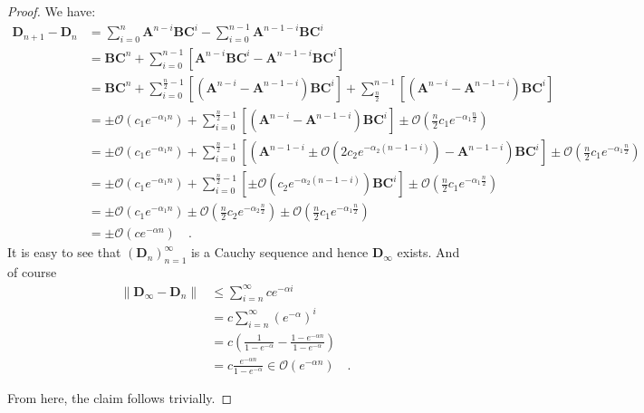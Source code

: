 \documentclass[../../main.tex]{subfiles}
\begin{document}
\begin{proof}
        We have:
        \begin{align*}
            \bm{D}_{n+1} - \bm{D}_{n} &= \sum_{i=0}^{n} \bm{A}^{n-i}\bm{BC}^i - \sum_{i=0}^{n-1} \bm{A}^{n-1-i}\bm{BC}^i \\
            &= \bm{BC}^n + \sum_{i=0}^{n-1} \left[ \bm{A}^{n-i}\bm{BC}^i - \bm{A}^{n-1-i}\bm{BC}^i \right] \\
            &= \bm{BC}^n + \sum_{i=0}^{\frac{n}{2}-1} \left[ \left( \bm{A}^{n-i} - \bm{A}^{n-1-i} \right) \bm{BC}^i \right] + \sum_{\frac{n}{2}}^{n-1} \left[ \left( \bm{A}^{n-i} - \bm{A}^{n-1-i} \right) \bm{BC}^i \right] \\
            &= \pm \mathcal{O}(c_1 e^{-\alpha_1 n}) + \sum_{i=0}^{\frac{n}{2}-1} \left[ \left( \bm{A}^{n-i} - \bm{A}^{n-1-i} \right) \bm{BC}^i \right] \pm \mathcal{O}(\frac{n}{2} c_1 e^{-\alpha_1 \frac{n}{2}}) \\
            &= \pm \mathcal{O}(c_1 e^{-\alpha_1 n}) + \sum_{i=0}^{\frac{n}{2}-1} \left[ \left( \bm{A}^{n-1-i} \pm \mathcal{O}(2c_2 e^{-\alpha_2 (n-1-i)}) - \bm{A}^{n-1-i} \right) \bm{BC}^i \right] \pm \mathcal{O}(\frac{n}{2} c_1 e^{-\alpha_1 \frac{n}{2}}) \\
            &= \pm \mathcal{O}(c_1 e^{-\alpha_1 n}) + \sum_{i=0}^{\frac{n}{2}-1} \left[ \pm \mathcal{O}(c_2 e^{-\alpha_2 (n-1-i)}) \bm{BC}^i \right] \pm \mathcal{O}(\frac{n}{2} c_1 e^{-\alpha_1 \frac{n}{2}}) \\
            &= \pm \mathcal{O}(c_1 e^{-\alpha_1 n})  \pm \mathcal{O}(\frac{n}{2} c_2 e^{-\alpha_2 \frac{n}{2}}) \pm \mathcal{O}(\frac{n}{2} c_1 e^{-\alpha_1 \frac{n}{2}}) \\
            &= \pm \mathcal{O}(c e^{-\alpha n}) \quad .
        \end{align*}
        It is easy to see that $(\bm{D}_n)_{n=1}^{\infty}$ is a Cauchy sequence and hence $\bm{D}_\infty$ exists. And of course
        \begin{align*}
            \|\bm{D}_\infty - \bm{D}_{n}\| &\leq \sum_{i=n}^{\infty} c e^{-\alpha i} \\
            &= c \sum_{i=n}^{\infty} (e^{-\alpha})^i \\
            &= c \left( \frac{1}{1 - e^{-\alpha}} - \frac{1 - e^{-\alpha n}}{1 - e^{-\alpha} } \right) \\
            &= c \frac{e^{-\alpha n}}{1 - e^{-\alpha}} \in \mathcal{O}(e^{-\alpha n}) \quad .
        \end{align*}
        
        From here, the claim follows trivially.
    \end{proof}
\end{document}

